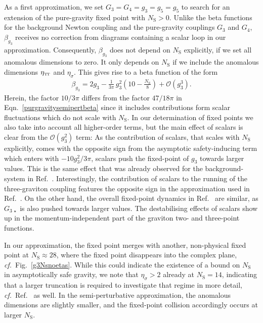 \documentclass[11pt]{book}
\newcommand\TTspace{ -1pt }
\newcommand\etaTT{ \eta_{\scriptscriptstyle{\mathrm{T\hspace{\TTspace}T}}} }
\newcommand\NS{ N_{\scriptscriptstyle{\mathrm{S}}} }
\newcommand\cf{\textit{cf.}\ }
\numberwithin{equation}{chapter}
\begin{document}
As a first approximation, we set $G_3=G_4=g_3=g_5=g_5$
to search for an extension of the pure-gravity fixed point with $\NS>0$.
Unlike the beta functions for the background Newton coupling and the pure-gravity
couplings $G_3$ and $G_4$, $\beta_{g_3}$ receives no correction from diagrams containing
a scalar loop  in our approximation.
Consequently, $\beta_{g_3}$ does not depend on $\NS$ explicitly, if we set all anomalous dimensions to zero.
It only depends on $\NS$ if we include the anomalous dimensions $\etaTT$ and $\eta_{\sigma}$.
This gives rise to a beta function of the form
\begin{align}
  \beta_{g_3} = 2 g_3 - \frac{1}{3\pi} \, g_3^2 \left( 10-\frac{\NS}{8} \right) + \mathcal{O}(g_3^3).
  \label{eq:betag3ch4a}
\end{align}
Herein, the factor $10/3\pi$ differs from the  factor $47/18\pi$ in
Eqn.~\eqref{purgravitysemipertbeta} since it includes contributions form scalar fluctuations
which do not scale with $\NS$.
In our determination of fixed points we also take into account all higher-order terms,
but the main effect of scalars is clear from the $\mathcal{O}(g_3^2)$ term:
As the contribution of scalars, that scales with $\NS$ explicitly,
comes with the opposite sign from the asymptotic safety-inducing term which enters with $-10g_3^2/3\pi$,
scalars push the fixed-point of $g_3$ towards larger values.
This is the same effect that was already observed for the background-system in Ref.~\cite{Dona:2013qba}.
Interestingly, the contribution of scalars to the running of the three-graviton coupling features
the opposite sign in the approximation used in Ref.~\cite{Meibohm:2015twa}.
On the other hand, the overall fixed-point dynamics in Ref.~\cite{Meibohm:2015twa} are similar,
as $G_{3\,\star}$ is also pushed towards larger values.
The destabilising effects of scalars show up in the momentum-independent part of the
graviton two- and three-point functions.

In our approximation, the fixed point merges with another,
non-physical fixed point at $\NS\approx 28$,
where the fixed point disappears into the complex plane,
\cf Fig.~\ref{g3Nsnoetas}.
While this could indicate the existence of a bound on $\NS$ in asymptotically safe gravity,
we note that $\eta_{\sigma}>2$ already at $\NS=14$,
indicating that a larger truncation is required to investigate that regime in more detail,
\cf Ref.~\cite{Meibohm:2015twa} as well. In the semi-perturbative approximation,
the anomalous dimensions are slightly smaller,
and the fixed-point collision accordingly occurs at larger $\NS$.
\end{document}
